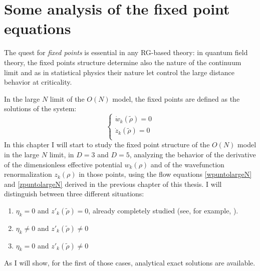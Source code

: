  

\chapter{Some analysis of the fixed point equations}
\noindent
The quest for \emph{fixed points} is essential in any RG-based theory: in quantum field theory, the fixed points structure determine also the nature of the continuum limit and as in statistical physics their nature let control the large distance behavior at criticality.

In the large $N$ limit of the $O(N)$ model, the fixed points are defined as the solutions of the system:
\begin{equation}
\label{sistema}
\left\{
\begin{array}{l}
\dot{w}_k(\widetilde{\rho}) = 0\\
\dot{z}_k(\widetilde{\rho}) = 0\\
\end{array}
\right.
\end{equation}
In this chapter I will start to study the fixed point structure of the $O(N)$ model in the large $N$ limit, in $D=3$ and $D=5$, analyzing the behavior of the derivative of the dimensionless effective potential $w_k(\rho)$ and of the wavefunction renormalization $z_k(\rho)$ in those points, using the
flow equations \eqref{wpuntolargeN} and \eqref{zpuntolargeN} derived in the previous chapter of this thesis. I will distinguish 
between three different situations:

\begin{enumerate}
 \item $\eta_k = 0$ and $z'_k(\widetilde{\rho}) = 0$, already completely studied (see, for example, \cite{vaccascaling}).
 \item $\eta_k \neq 0$ and $z'_k(\widetilde{\rho}) \neq 0$
 \item $\eta_k = 0$ and $z'_k(\widetilde{\rho}) \neq 0$
\end{enumerate}
As I will show, for the first of those cases, analytical exact solutions are available.

